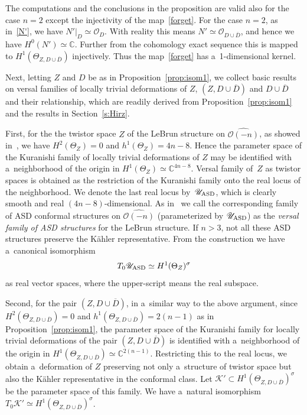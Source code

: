\documentclass[11pt]{article}
\numberwithin{equation}{section}
\begin{document}
\begin{Remark}
The computations and the conclusions in the proposition are valid also for the case $n=2$ except the injectivity of the
map~\eqref{forget}.
For the case $n=2$, as in~\eqref{N'}, we have $N'|_D\simeq \mathscr O_D$.
With reality this means $N'\simeq \mathscr O_{D\cup\overline D}$, and hence we have $H^0(N')\simeq\mathbb{C}$.
Further from the cohomology exact sequence this is mapped to $H^1(\Theta_{Z,D\cup \overline D})$ injectively.
Thus the map~\eqref{forget} has a~1-dimensional kernel.
\end{Remark}

Next, letting $Z$ and $D$ be as in Proposition~\ref{prop:isom1}, we collect basic results on versal families of locally
trivial deformations of $Z$, $(Z,D\cup\overline D)$ and $D\cup \overline D$ and their relationship, which are readily
derived from Proposition~\ref{prop:isom1} and the results in Section~\ref{s:Hirz}.

First, for the the twistor space $Z$ of the LeBrun structure on $\widehat{\mathscr O(-n)}$, as showed
in~\cite[Proposition~2.1]{HonCMP2}, we have $H^2(\Theta_Z)=0$ and $h^1(\Theta_Z)=4n-8$.
Hence the parameter space of the Kuranishi family of locally trivial deformations of $Z$ may be identif\/ied with
a~neighborhood of the origin in $H^1(\Theta_Z)\simeq\mathbb{C}^{4n-8}$.
Versal family of~$Z$ as twistor spaces is obtained as the restriction of the Kuranishi family onto the real locus of the
neighborhood.
We denote the last real locus by~$\mathscr U_{\rm{ASD}}$, which is clearly smooth and real $(4n-8)$-dimensional.
As in~\cite{HonCMP2} we call the corresponding family of ASD conformal structures on $\widehat{\mathscr O(-n)}$
(parameterized by $\mathscr U_{\rm{ASD}}$) as the {\em versal family of ASD structures} for the LeBrun structure.
If $n>3$, not all these ASD structures preserve the K\"ahler representative.
From the construction we have a~canonical isomorphism
\begin{gather*}%
T_0\mathscr U_{\rm{ASD}}\simeq H^1(\Theta_Z)^{\sigma}
\end{gather*}
as real vector spaces, where the upper-script means the real subspace.

Second, for the pair $(Z,D\cup\overline D)$, in a~similar way to the above argument, since $ H^2 (\Theta_{Z,  D \cup
\overline D} ) =0$ and $ h^1 (\Theta_{Z,  D \cup \overline D} ) =2(n-1)$ as in Proposition~\ref{prop:isom1}, the
parameter space of the Kuranishi family for locally trivial deformations of the pair $(Z,D\cup\overline D)$ is
identif\/ied with a~neighborhood of the origin in $H^1 (\Theta_{Z, D \cup \overline D} ) \simeq\mathbb{C}^{2(n-1)}$.
Restricting this to the real locus, we obtain a~deformation of $Z$ preserving not only a~structure of twistor space but
also the K\"ahler representative in the conformal class.
Let $\mathscr K'\subset H^1(\Theta_{Z,D\cup\overline D})^{\sigma}$ be the parameter space of this family.
We have a~natural isomorphism $ T_0\mathscr K'\simeq H^1(\Theta_{Z,D\cup\overline D})^{\sigma} $.
\end{document}
